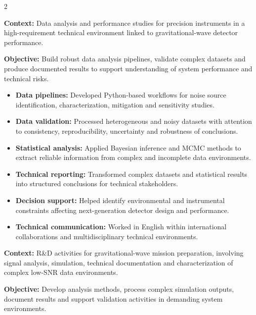 \documentclass[8pt,a4paper,ragged2e,withhyper]{altacv}
\begin{document}
\begin{paracol}{2}
\divider


\textbf{Context:} Data analysis and performance studies for precision instruments in a high-requirement technical environment linked to gravitational-wave detector performance.

\textbf{Objective:} Build robust data analysis pipelines, validate complex datasets and produce documented results to support understanding of system performance and technical risks.

\begin{itemize}
  \item \textbf{Data pipelines:} Developed Python-based workflows for noise source identification, characterization, mitigation and sensitivity studies.
  \item \textbf{Data validation:} Processed heterogeneous and noisy datasets with attention to consistency, reproducibility, uncertainty and robustness of conclusions.
  \item \textbf{Statistical analysis:} Applied Bayesian inference and MCMC methods to extract reliable information from complex and incomplete data environments.
  \item \textbf{Technical reporting:} Transformed complex datasets and statistical results into structured conclusions for technical stakeholders.
  \item \textbf{Decision support:} Helped identify environmental and instrumental constraints affecting next-generation detector design and performance.
  \item \textbf{Technical communication:} Worked in English within international collaborations and multidisciplinary technical environments.
\end{itemize}

\divider


\textbf{Context:} R\&D activities for gravitational-wave mission preparation, involving signal analysis, simulation, technical documentation and characterization of complex low-SNR data environments.

\textbf{Objective:} Develop analysis methods, process complex simulation outputs, document results and support validation activities in demanding system environments.


\end{paracol}
\end{document}
